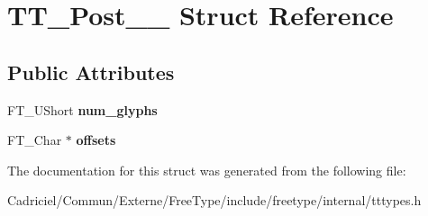 \hypertarget{struct_t_t___post__25__}{\section{T\-T\-\_\-\-Post\-\_\-\_\- Struct Reference}
\label{struct_t_t___post__25__}
}
\subsection*{Public Attributes}
\begin{DoxyCompactItemize}
\item 
\hypertarget{struct_t_t___post__25___aae397ce6206c910ecc13f8b46bace595}{F\-T\-\_\-\-U\-Short {\bfseries num\-\_\-glyphs}}\label{struct_t_t___post__25___aae397ce6206c910ecc13f8b46bace595}

\item 
\hypertarget{struct_t_t___post__25___a499ec966b258c8454e9ea8f9455028b6}{F\-T\-\_\-\-Char $\ast$ {\bfseries offsets}}\label{struct_t_t___post__25___a499ec966b258c8454e9ea8f9455028b6}

\end{DoxyCompactItemize}


The documentation for this struct was generated from the following file\-:\begin{DoxyCompactItemize}
\item 
Cadriciel/\-Commun/\-Externe/\-Free\-Type/include/freetype/internal/tttypes.\-h\end{DoxyCompactItemize}
